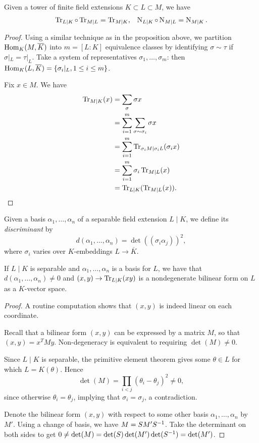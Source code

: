 \begin{cor}
	Given a tower of finite field extensions $K\subset L\subset M$, we have
	\begin{align*}
		\operatorname{Tr}_{L\mid K} \circ \operatorname{Tr}_{M\mid L} = \operatorname{Tr}_{M\mid K}, & & \operatorname{N}_{L\mid K} \circ \operatorname{N}_{M\mid L} = \operatorname{N}_{M\mid K}.
	\end{align*}
\end{cor}
\begin{proof}
	Using a similar technique as in the proposition above, we partition $\text{Hom}_K(M,\overline{K})$ into $m=[L:K]$ equivalence classes by identifying $\sigma\sim\tau$ if $\sigma|_L = \tau|_L$. Take a system of representatives $\sigma_1,\dots,\sigma_m$: then $\text{Hom}_K(L,\overline{K}) = \{\sigma_i|_L , 1\leq i \leq m\}$.

	Fix $x\in M$. We have
	\begin{align*}
		\operatorname{Tr}_{M\mid K}(x) &= \sum_\sigma \sigma x\\
			&= \sum_{i=1}^m \sum_{\sigma\sim\sigma_i} \sigma x\\
			&= \sum_{i=1}^m \operatorname{Tr}_{\sigma_i M\mid \sigma_i L}(\sigma_i x)\\
			&= \sum_{i=1}^m \sigma_i \operatorname{Tr}_{M\mid L}(x)\\
			&= \operatorname{Tr}_{L\mid K}(\operatorname{Tr}_{M\mid L}(x)).
	\end{align*}

\end{proof}


Given a basis $\alpha_1,\dots,\alpha_n$ of a separable field extension $L\mid K$, we define its \emph{discriminant} by
\[
	d(\alpha_1,\dots,\alpha_n) = \det((\sigma_i\alpha_j))^2,
\]
where $\sigma_i$ varies over $K$-embeddings $L\to\overline{K}$.


\begin{prop}
	If $L\mid K$ is separable and $\alpha_1,\dots,\alpha_n$ is a basis for $L$, we have that $d(\alpha_1,\dots,\alpha_n)\neq 0$ and $(x,y) \to \operatorname{Tr}_{L\mid K}(xy)$ is a nondegenerate bilinear form on $L$ as a $K$-vector space.
\end{prop}
\begin{proof}
	A routine computation shows that $(x,y)$ is indeed linear on each coordinate.

	Recall that a bilinear form $(x,y)$ can be expressed by a matrix $M$, so that $(x,y) = x^T M y$. Non-degeneracy is equivalent to requiring $\det(M)\neq 0$.
	
	Since $L\mid K$ is separable, the primitive element theorem gives some $\theta\in L$ for which $L=K(\theta)$. Hence
	\[
		\det(M) = \prod_{i<j}(\theta_i-\theta_j)^2 \neq 0,
	\]
	since otherwise $\theta_i = \theta_j$, implying that $\sigma_i=\sigma_j$, a contradiction.

	Denote the bilinear form $(x,y)$ with respect to some other basis $\alpha_1,\dots,\alpha_n$ by $M'$. Using a change of basis, we have $M=SM'S^{-1}$. Take the determinant on both sides to get $0\neq\det(M)=\det(S)\det(M')\det(S^{-1})=\det(M')$.
\end{proof}



